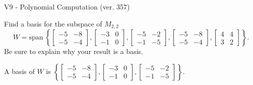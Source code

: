 \begin{exercise}
  \begin{exerciseTitle}V9 - Polynomial Computation (ver. 357)\end{exerciseTitle}
  \begin{exerciseStatement}
    Find a basis for the subspace of \(M_{2,2}\) 
\[W=\mathrm{span}\ \left\{\left[\begin{array}{cc}
-5 & -8 \\
-5 & -4
\end{array}\right] , \left[\begin{array}{cc}
-3 & 0 \\
-1 & 0
\end{array}\right] , \left[\begin{array}{cc}
-5 & -2 \\
-1 & -5
\end{array}\right] , \left[\begin{array}{cc}
-5 & -8 \\
-5 & -4
\end{array}\right] , \left[\begin{array}{cc}
4 & 4 \\
3 & 2
\end{array}\right]\right\}.\]
 Be sure to explain why your result is a basis.


  \end{exerciseStatement}
  \begin{exerciseAnswer}
   A basis of \(W\) is  \(\left\{\left[\begin{array}{cc}
-5 & -8 \\
-5 & -4
\end{array}\right] , \left[\begin{array}{cc}
-3 & 0 \\
-1 & 0
\end{array}\right] , \left[\begin{array}{cc}
-5 & -2 \\
-1 & -5
\end{array}\right]\right\}\).
  


  \end{exerciseAnswer}
\end{exercise}